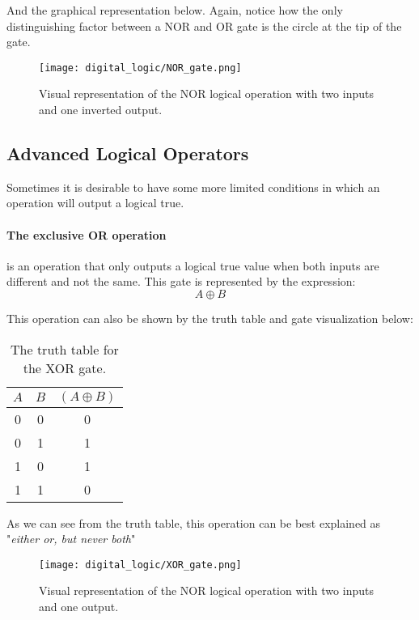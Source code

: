     And the graphical representation below. 
    Again, notice how the only distinguishing factor between a NOR and OR gate is the circle at the tip of the gate.
    \begin{figure}[h!]
        \texttt{[image: digital\_logic/NOR\_gate.png]}
        \caption[NOR Gate]{Visual representation of the NOR logical operation with two inputs and one inverted output.}
    \end{figure}

    \subsection{Advanced Logical Operators}
    Sometimes it is desirable to have some more limited conditions in which an operation will output a logical true.
    
    \paragraph*{The exclusive OR operation} is an operation that only outputs a logical true value when both inputs are different and not the same.
    This gate is represented by the expression:
    \begin{equation*}
        A \oplus B
    \end{equation*}

    This operation can also be shown by the truth table and gate visualization below:
    \begin{table}[h!]
        \begin{tabular}{c c | c}
            \toprule
            $A$ & $B$ & $(A \oplus B)$  \\
            \midrule
             0  &  0  &    0    \\
             
             0  &  1  &    1    \\
             1  &  0  &    1    \\
             1  &  1  &    0    \\
            \bottomrule
        \end{tabular}
        \caption[XOR Gate Truth Table]{The truth table for the XOR gate.}
    \end{table}

    As we can see from the truth table, this operation can be best explained as "\textit{either or, but never both}"

    \begin{figure}[h!]
        \texttt{[image: digital\_logic/XOR\_gate.png]}
        \caption[NOR Gate]{Visual representation of the NOR logical operation with two inputs and one output.}
    \end{figure}

